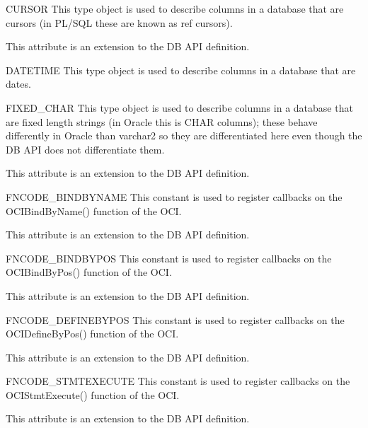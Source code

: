 \documentclass{manual}
\begin{document}
\begin{datadesc}{CURSOR}
  This type object is used to describe columns in a database that are cursors
  (in PL/SQL these are known as ref cursors).

   This attribute is an extension to the DB API definition.
\end{datadesc}

\begin{datadesc}{DATETIME}
  This type object is used to describe columns in a database that are dates.
\end{datadesc}

\begin{datadesc}{FIXED_CHAR}
  This type object is used to describe columns in a database that are fixed
  length strings (in Oracle this is CHAR columns); these behave differently
  in Oracle than varchar2 so they are differentiated here even though the DB
  API does not differentiate them.

   This attribute is an extension to the DB API definition.
\end{datadesc}

\begin{datadesc}{FNCODE_BINDBYNAME}
  This constant is used to register callbacks on the OCIBindByName() function
  of the OCI.

   This attribute is an extension to the DB API definition.
\end{datadesc}

\begin{datadesc}{FNCODE_BINDBYPOS}
  This constant is used to register callbacks on the OCIBindByPos() function
  of the OCI.

   This attribute is an extension to the DB API definition.
\end{datadesc}

\begin{datadesc}{FNCODE_DEFINEBYPOS}
  This constant is used to register callbacks on the OCIDefineByPos() function
  of the OCI.

   This attribute is an extension to the DB API definition.
\end{datadesc}

\begin{datadesc}{FNCODE_STMTEXECUTE}
  This constant is used to register callbacks on the OCIStmtExecute() function
  of the OCI.

   This attribute is an extension to the DB API definition.
\end{datadesc}
\end{document}
